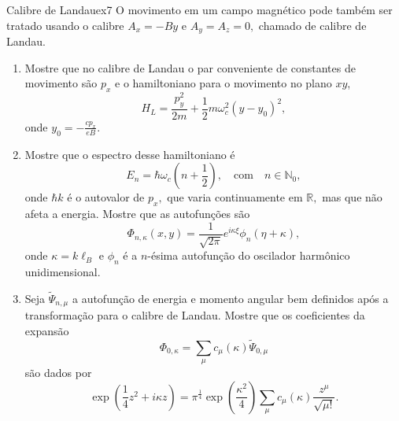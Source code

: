 \begin{exercício}{Calibre de Landau}{ex7}
   O movimento em um campo magnético pode também ser tratado usando o calibre \(A_x = - By\) e \(A_y = A_z = 0,\) chamado de calibre de Landau. 
   \begin{enumerate}[label=(\alph*)]
      \item Mostre que no calibre de Landau o par conveniente de constantes de movimento são \(p_x\) e o hamiltoniano para o movimento no plano \(xy\),
         \begin{equation*}
            H_L = \frac{p_y^2}{2m} + \frac12 m \omega_c^2 (y - y_0)^2,
         \end{equation*}
         onde \(y_0 = - \frac{cp_x}{eB}.\)
      \item Mostre que o espectro desse hamiltoniano é
         \begin{equation*}
            E_n = \hbar \omega_c \left(n + \frac12\right),\quad\text{com}\quad n \in \mathbb{N}_0,
         \end{equation*}
         onde \(\hbar k\) é o autovalor de \(p_x,\) que varia continuamente em \(\mathbb{R},\) mas que não afeta a energia. Mostre que as autofunções são
         \begin{equation*}
            \Phi_{n, \kappa}(x,y) = \frac{1}{\sqrt{2\pi}} e^{i \kappa \xi} \phi_n(\eta + \kappa),
         \end{equation*}
         onde \(\kappa = k \ell_B\) e \(\phi_n\) é a \(n\)-ésima autofunção do oscilador harmônico unidimensional.
      \item Seja \(\tilde{\Psi}_{n,\mu}\) a autofunção de energia e momento angular bem definidos após a transformação para o calibre de Landau. Mostre que os coeficientes da expansão
         \begin{equation*}
            \Phi_{0, \kappa} = \sum_{\mu} c_\mu(\kappa) \tilde{\Psi}_{0,\mu}
         \end{equation*}
         são dados por
         \begin{equation*}
            \exp\left(\frac14 z^2 + i \kappa z\right) = \pi^{\frac14} \exp\left(\frac{\kappa^2}{4}\right) \sum_{\mu} c_{\mu}(\kappa) \frac{z^\mu}{\sqrt{\mu!}}.
         \end{equation*}
   \end{enumerate}
\end{exercício}
